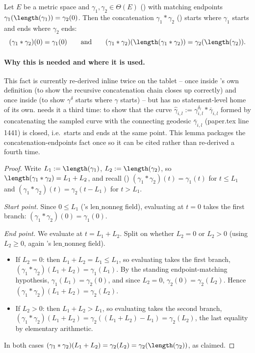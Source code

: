 \begin{lemma}
  Let $E$ be a metric space and $\gamma_1,\gamma_2 \in \Theta(E)$ () with matching
  endpoints $\gamma_1(\length(\gamma_1))=\gamma_2(0)$. Then the concatenation $\gamma_1*\gamma_2$
  () starts where $\gamma_1$ starts and ends where $\gamma_2$ ends:
  \[
    (\gamma_1*\gamma_2)(0) = \gamma_1(0)
    \qquad\text{and}\qquad
    (\gamma_1*\gamma_2)(\length(\gamma_1*\gamma_2)) = \gamma_2(\length(\gamma_2))
    .
  \]

  \paragraph{Why this is needed and where it is used.} This fact is currently re-derived inline
  twice on the tablet -- once inside 's own definition (to show the
  recursive concatenation chain closes up correctly) and once inside 
  (to show $\gamma^\delta$ starts where $\gamma$ starts) -- but has no statement-level home of its
  own.  needs it a third time: to show that the curve
  $\hat\gamma_{i,l} := \gamma^{\delta_l}_{i,l} * \bar\gamma_{i,l}$ formed by concatenating the
  sampled curve with the connecting geodesic $\bar\gamma_{i,l}$ (paper.tex line 1441) is closed,
  i.e.\ starts and ends at the same point. This lemma packages the concatenation-endpoints fact
  once so it can be cited rather than re-derived a fourth time.
\end{lemma}
\begin{proof}
  Write $L_1 := \length(\gamma_1)$, $L_2 := \length(\gamma_2)$, so
  $\length(\gamma_1*\gamma_2) = L_1+L_2$, and recall ()
  $(\gamma_1*\gamma_2)(t) = \gamma_1(t)$ for $t \le L_1$ and $(\gamma_1*\gamma_2)(t) =
  \gamma_2(t-L_1)$ for $t > L_1$.

  \emph{Start point.} Since $0 \le L_1$ ('s $\mathrm{len\_nonneg}$ field), evaluating
  at $t=0$ takes the first branch: $(\gamma_1*\gamma_2)(0) = \gamma_1(0)$.

  \emph{End point.} We evaluate at $t = L_1+L_2$. Split on whether $L_2 = 0$ or $L_2 > 0$ (using
  $L_2 \ge 0$, again 's $\mathrm{len\_nonneg}$ field).
  \begin{itemize}
    \item If $L_2 = 0$: then $L_1+L_2 = L_1 \le L_1$, so evaluating takes the first branch,
      $(\gamma_1*\gamma_2)(L_1+L_2) = \gamma_1(L_1)$. By the standing endpoint-matching hypothesis,
      $\gamma_1(L_1) = \gamma_2(0)$, and since $L_2=0$, $\gamma_2(0) = \gamma_2(L_2)$. Hence
      $(\gamma_1*\gamma_2)(L_1+L_2) = \gamma_2(L_2)$.
    \item If $L_2 > 0$: then $L_1+L_2 > L_1$, so evaluating takes the second branch,
      $(\gamma_1*\gamma_2)(L_1+L_2) = \gamma_2((L_1+L_2)-L_1) = \gamma_2(L_2)$, the last equality by
      elementary arithmetic.
  \end{itemize}
  In both cases $(\gamma_1*\gamma_2)(L_1+L_2) = \gamma_2(L_2) = \gamma_2(\length(\gamma_2))$, as
  claimed.
\end{proof}
